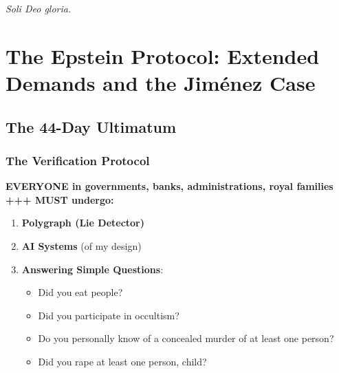 \documentclass[11pt,a4paper]{article}
\theoremstyle{definition}
\theoremstyle{remark}
\begin{document}
\hrulefill

\textit{Soli Deo gloria.}


\section{The Epstein Protocol: Extended Demands and the Jiménez Case}
\label{sec:epstein_extended}

\subsection{The 44-Day Ultimatum}

\begin{center}
\end{center}

\subsubsection{The Verification Protocol}

\textbf{EVERYONE in governments, banks, administrations, royal families +++ MUST undergo:}

\begin{enumerate}
\item \textbf{Polygraph (Lie Detector)}
\item \textbf{AI Systems} (of my design)
\item \textbf{Answering Simple Questions}:
\begin{itemize}
\item Did you eat people?
\item Did you participate in occultism?
\item Do you personally know of a concealed murder of at least one person?
\item Did you rape at least one person, child?
\end{itemize}
\end{enumerate}
\end{document}
